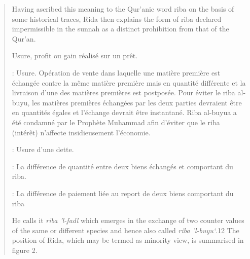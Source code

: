 \begin{quote}
Having ascribed this meaning to the Qur'anic word riba on the basis of some historical traces, Rida then explains the form of riba declared impermissible in the sunnah as a distinct prohibition from that of the Qur'an.
\begin{Def}[Riba] Usure, profit ou gain réalisé sur un prêt.
\end{Def}

\begin{Def}
 : Usure. Opération de vente dans laquelle une matière première est échangée contre la même matière première mais en quantité différente et la livraison d’une des matières premières est postposée. Pour éviter le riba al-buyu, les matières premières échangées par les deux parties devraient être en quantités égales et l’échange devrait être instantané. Riba al-buyua a été condamné par le Prophète Muhammad afin d’éviter que le riba (intérêt) n’affecte insidieusement l’économie.
\end{Def}
\begin{Def} : Usure d’une dette.
\end{Def}
 
\begin{Def} : La différence de quantité entre deux biens échangés et comportant du riba.
\end{Def}
\begin{Def} : La différence de paiement liée au report de deux biens comportant du riba
\end{Def} He calls it \textit{riba 'l-fadl} which emerges in the exchange of two counter values of the same or different species and hence also called \textit{riba 'l-buyu‘}.12 The position of Rida, which may be termed as minority view, is summarised in figure 2.



\end{quote}
